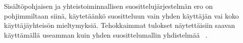 \documentclass[12pt,finnish]{tktltiki2}
\theoremstyle{definition}
\theoremstyle{remark}
\begin{document}
Sisältöpohjaisen ja yhteistoiminnallisen suosittelujärjestelmän ero on pohjimmiltaan siinä, käytetäänkö suositteluun vain yhden käyttäjän vai koko käyttäjäyhteisön mieltymyksiä. Tehokkaimmat tulokset näytettäisiin saavan käyttämällä useamman kuin yhden suosittelumallin yhdistelmää ~\cite{Bell:2007:LNP:1345448.1345465}.





%
%
% 
%







 
\end{document}
